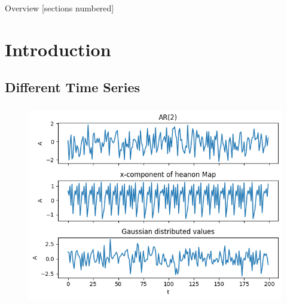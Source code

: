 \titleframe

\begin{frame}[shrink=25]{Overview}
  [sections numbered]
  \tableofcontents[hideallsubsections]
\end{frame}

\AtBeginSection{}
\section{Introduction}
\subsection{Different Time Series}
\begin{frame}
    \frametitle{\insertsectionhead}
\framesubtitle{\insertsubsectionhead}
\begin{figure}
    \centering
    \includegraphics[height=0.8\textheight]{figs/time_series.png}
\end{figure}
\end{frame}

